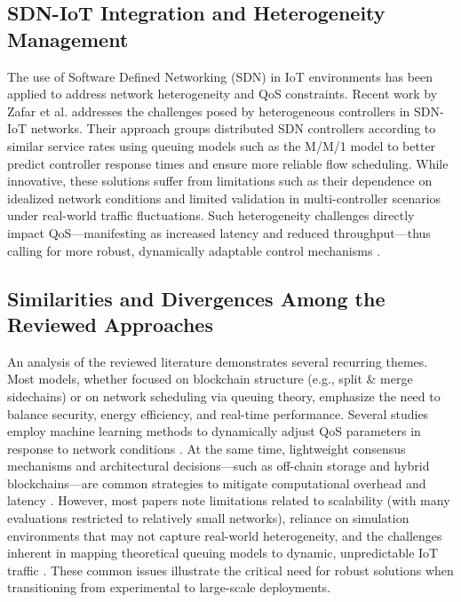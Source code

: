 \documentclass[12pt,onecolumn]{IEEEtran} %
\begin{document}
\subsection*{SDN-IoT Integration and Heterogeneity Management}
The use of Software Defined Networking (SDN) in IoT environments has been applied to address network heterogeneity and QoS constraints. Recent work by Zafar et al. \cite{zafar2023anadvancedstrategy} addresses the challenges posed by heterogeneous controllers in SDN-IoT networks. Their approach groups distributed SDN controllers according to similar service rates using queuing models such as the M/M/1 model to better predict controller response times and ensure more reliable flow scheduling. While innovative, these solutions suffer from limitations such as their dependence on idealized network conditions and limited validation in multi-controller scenarios under real-world traffic fluctuations. Such heterogeneity challenges directly impact QoS---manifesting as increased latency and reduced throughput---thus calling for more robust, dynamically adaptable control mechanisms \cite{zafar2023anadvancedstrategy}.

\subsection*{Similarities and Divergences Among the Reviewed Approaches}
An analysis of the reviewed literature demonstrates several recurring themes. Most models, whether focused on blockchain structure (e.g., split \& merge sidechains) or on network scheduling via queuing theory, emphasize the need to balance security, energy efficiency, and real-time performance. Several studies employ machine learning methods to dynamically adjust QoS parameters in response to network conditions \cite{agrawal2022mlsmbqsdesignof,zhang2024ondemandcentralizedresource}. At the same time, lightweight consensus mechanisms and architectural decisions---such as off-chain storage and hybrid blockchains---are common strategies to mitigate computational overhead and latency \cite{haque2024ascalableblockchain}. However, most papers note limitations related to scalability (with many evaluations restricted to relatively small networks), reliance on simulation environments that may not capture real-world heterogeneity, and the challenges inherent in mapping theoretical queuing models to dynamic, unpredictable IoT traffic \cite{habeeb2022dynamicbandwidthslicing,zhang2024ondemandcentralizedresource}. These common issues illustrate the critical need for robust solutions when transitioning from experimental to large-scale deployments.
\end{document}
